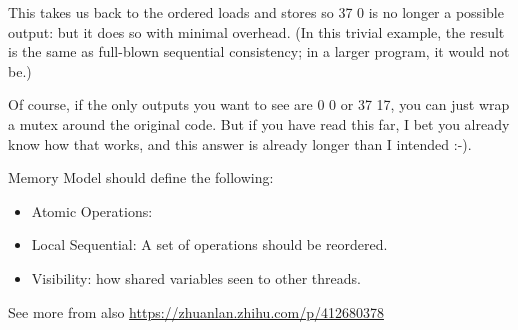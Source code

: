 This takes us back to the ordered loads and stores
 so 37 0 is no longer a possible output: but it does so with minimal overhead. 
 (In this trivial example, the result is the same as full-blown sequential 
 consistency; in a larger program, it would not be.)

Of course, if the only outputs you want to see are 0 0 or 37 17, 
you can just wrap a mutex around the original code. But if you have read 
this far, I bet you already know how that works, and this answer is 
already longer than I intended :-).


Memory Model should define the following:

\begin{itemize}
\item Atomic Operations:
\item Local Sequential: A set of operations should be reordered.
\item Visibility: how shared variables seen to other threads.
\end{itemize}    


See more from \cite{CppConcu2:online} also \url{https://zhuanlan.zhihu.com/p/412680378}